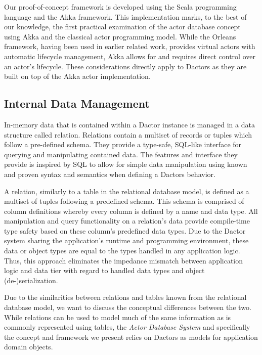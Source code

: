 Our proof-of-concept framework is developed using the Scala programming language and the Akka framework.
This implementation marks, to the best of our knowledge, the first practical examination of the actor database concept using Akka and the classical actor programming model.
While the Orleans framework, having been used in earlier related work, provides virtual actors with automatic lifecycle management, Akka allows for and requires direct control over an actor's lifecycle.
These considerations directly apply to Dactors as they are built on top of the Akka actor implementation.

\subsection{Internal Data Management}

In-memory data that is contained within a Dactor instance is managed in a data structure called relation.
Relations contain a multiset of records or tuples which follow a pre-defined schema.
They provide a type-safe, SQL-like interface for querying and manipulating contained data.
The features and interface they provide is inspired by SQL to allow for simple data manipulation using known and proven syntax and semantics when defining a Dactors behavior.

A relation, similarly to a table in the relational database model, is defined as a multiset of tuples following a predefined schema.
This schema is comprised of column definitions whereby every column is defined by a name and data type.
All manipulation and query functionality on a relation's data provide compile-time type safety based on these column's predefined data types.
Due to the Dactor system sharing the application's runtime and programming environment, these data or object types are equal to the types handled in any application logic.
Thus, this approach eliminates the impedance mismatch between application logic and data tier with regard to handled data types and object (de-)serialization.

Due to the similarities between relations and tables known from the relational database model, we want to discuss the conceptual differences between the two.
While relations can be used to model much of the same information as is commonly represented using tables, the \textit{Actor Database System} and specifically the concept and framework we present relies on Dactors as models for application domain objects.

